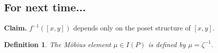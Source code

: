\documentclass[11pt]{article}
\newtheorem{definition}[theorem]{Definition}
\begin{document}
\subsection{For next time...}

\textbf{Claim.} $f^{-1}([x,y])$ depends only on the poset structure of $[x,y]$.

\begin{definition} The M\"{o}bius element $\mu \in I(P)$ is defined by $\mu = \zeta^{-1}.$ \end{definition}
\end{document}
